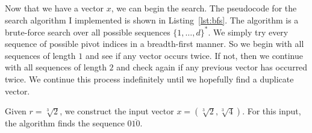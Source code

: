Now that we have a vector $x$, we can begin the search.
The pseudocode for the search algorithm I implemented is shown in Listing~\ref{lst:bfs}.
The algorithm is a brute-force search over all possible sequences $\{1,\dots,d\}^*$.
We simply try every sequence of possible pivot indices in a breadth-first manner.
So we begin with all sequences of length $1$ and see if any vector occurs twice.
If not, then we continue with all sequences of length $2$ and check again if
any previous vector has occurred twice.
We continue this process indefinitely until we hopefully find a duplicate vector.

\begin{example}
  Given $r = \sqrt[3]{2}$, we construct the input vector $x = \left(\sqrt[3]{2}, \sqrt[3]{4}\right)$.
  For this input, the algorithm finds the sequence $0\overline{10}$.

\end{example}






